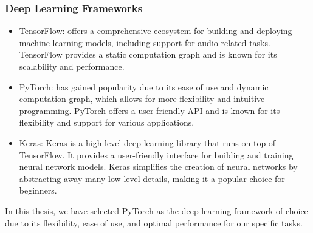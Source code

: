 \begin{frame}
    \frametitle{Deep Learning Frameworks}

    \begin{itemize}
        \item TensorFlow: offers a comprehensive ecosystem for building and deploying machine learning models, including support for audio-related tasks. TensorFlow provides a static computation graph and is known for its scalability and performance.

        \item PyTorch: has gained popularity due to its ease of use and dynamic computation graph, which allows for more flexibility and intuitive programming. PyTorch offers a user-friendly API and is known for its flexibility and support for various applications.

        \item Keras: Keras is a high-level deep learning library that runs on top of TensorFlow. It provides a user-friendly interface for building and training neural network models. Keras simplifies the creation of neural networks by abstracting away many low-level details, making it a popular choice for beginners.

    \end{itemize}

    In this thesis, we have selected PyTorch as the deep learning framework of choice due to its flexibility, ease of use, and optimal performance for our specific tasks.

\end{frame}


